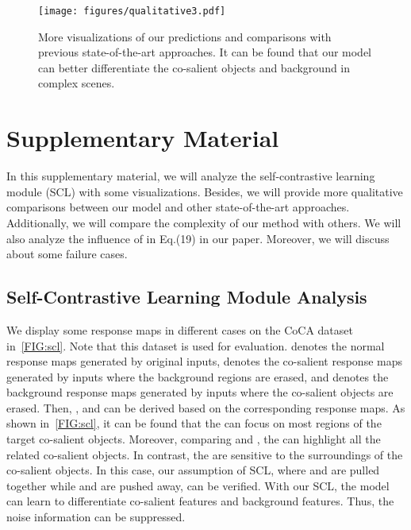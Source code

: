 \documentclass[10pt,twocolumn,letterpaper]{article}
\begin{document}
\appendix
\begin{figure*}
\centering
	\texttt{[image: figures/qualitative3.pdf]}
	\caption{More visualizations of our predictions and comparisons with previous state-of-the-art approaches. It can be found that our model can better differentiate the co-salient objects and background in complex scenes.}
	\label{FIG:qual}
\end{figure*}
\section{Supplementary Material}
In this supplementary material, we will analyze the self-contrastive learning module (SCL) with some visualizations. Besides, we will provide more qualitative comparisons between our model and other state-of-the-art approaches. Additionally, we will compare the complexity of our method with others. We will also analyze the influence of  in Eq.(19) in our paper. Moreover, we will discuss about some failure cases.

\subsection{Self-Contrastive Learning Module Analysis}
We display some response maps in different cases on the CoCA dataset~\cite{zhang2020gradient} in~\cref{FIG:scl}. Note that this dataset is used for evaluation.  denotes the normal response maps generated by original inputs,  denotes the co-salient response maps generated by inputs where the background regions are erased, and  denotes the background response maps generated by inputs where the co-salient objects are erased. Then, ,  and  can be derived based on the corresponding response maps. As shown in~\cref{FIG:scl}, it can be found that the  can focus on most regions of the target co-salient objects. Moreover, comparing  and , the  can highlight all the related co-salient objects. In contrast, the  are sensitive to the surroundings of the co-salient objects. In this case, our assumption of SCL, where  and  are pulled together while  and  are pushed away, can be verified. With our SCL, the model can learn to differentiate co-salient features and background features. Thus, the noise information can be suppressed.
\end{document}

